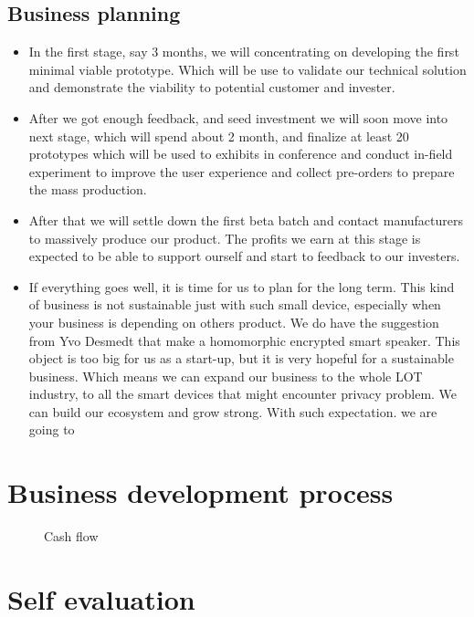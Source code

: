 \documentclass[12pt,twoside]{article}
\begin{document}
\subsection{Business planning}
\begin{itemize}
\item In the first stage, say 3 months, we will concentrating on developing the first minimal viable prototype. Which will be use to validate our technical solution and
demonstrate the viability to potential customer and invester. 
\item After we got enough feedback, and seed investment we will soon move into next stage, which will spend about 2 month, and finalize at least 20 prototypes 
which will be used to exhibits in conference and conduct in-field experiment to improve the user experience and 
collect pre-orders to prepare the mass production. 
\item After that we will settle down the first beta batch and contact manufacturers to massively produce our product.
The profits we earn at this stage is expected to be able to support ourself and start to feedback to our investers.
\item If everything goes well, it is time for us to plan for the long term. This kind of business is not sustainable just with such small device, especially when your 
business is depending on others product. We do have the suggestion from Yvo Desmedt that make a homomorphic encrypted smart speaker. This object is too big for us as 
a start-up, but it is very hopeful for a sustainable business. Which means we can expand our business to the whole LOT industry, to all the smart devices that might encounter
privacy problem. We can build our ecosystem and grow strong. With such expectation. we are going to 
\end{itemize}


\section{Business development process}
\label{sec:Business development process}


\begin{figure}[!h]
    \centering
    \caption{Cash flow}
    \label{fig:Cash flow}
\end{figure}


\section{Self evaluation}



\end{document}

